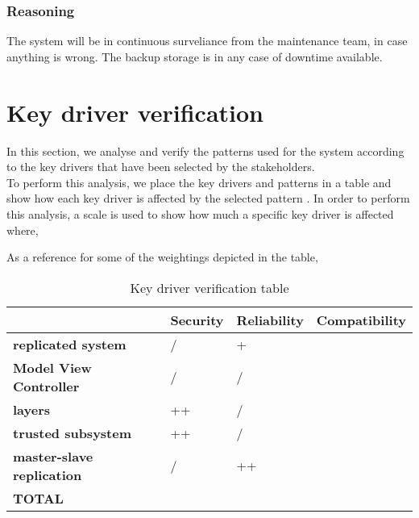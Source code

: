 \subsubsection{Reasoning}

The system will be in continuous surveliance from the maintenance team, in case anything is wrong. The backup storage is in any case of downtime available. 
\newpage


\section{Key driver verification}
In this section, we analyse and verify the patterns used for the system according to the key drivers that have been selected by the stakeholders.\\
To perform this analysis, we place the key drivers and patterns in a table and show how each key driver is affected by the selected pattern \cite{web:patterns-v-QAs} . In order to perform this analysis, a scale is used to show how much a specific key driver is affected where,

As a reference for some of the weightings depicted in the table, 

\begin{table}[H]
    \begin{tabularx}{\textwidth}{p{3.5cm}|>{\centering\arraybackslash}X|>{\centering\arraybackslash}X|>{\centering\arraybackslash}X}
    	 & \textbf{Security} & \textbf{Reliability} & \textbf{Compatibility} \\ \hline
    	\textbf{replicated system}         & /  & +  &  \\ \hline
    	\textbf{Model View Controller}  & /  & / &   \\ \hline
    	\textbf{layers}                    & ++ & /  &   \\ \hline
    	\textbf{trusted subsystem}         & ++ & /  &   \\ \hline
    	\textbf{master-slave replication}  & /  & ++ &   \\ \hline
	 \textbf{TOTAL} & \textbf{} & \textbf{} & \textbf{} \\
    \end{tabularx}
    \caption{Key driver verification table}
\end{table}